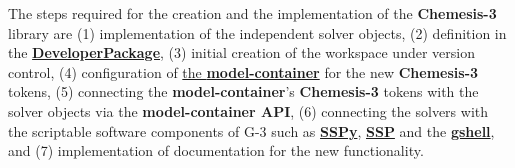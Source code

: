 \documentclass[12pt]{article}
\begin{document}
The steps required for the creation and the implementation of the {\bf
  Chemesis-3} library are (1) implementation of the independent solver
objects, (2) definition in the
\href{../developer-package/developer-package.tex}{\bf
  DeveloperPackage}, (3) initial creation of the workspace under
version control, (4) configuration of
\href{model-container/model-container.tex}{the {\bf model-container}}
for the new {\bf Chemesis-3} tokens, (5) connecting the {\bf
  model-container}'s {\bf Chemesis-3} tokens with the solver objects via
the {\bf model-container API}, (6) connecting the solvers with the
scriptable software components of G-3 such as
\href{../sspy/sspy.tex}{\bf SSPy}, \href{../ssp/ssp.tex}{\bf SSP} and
the \href{../gshell/gshell.tex}{\bf gshell}, and (7) implementation of
documentation for the new functionality.
\end{document}
